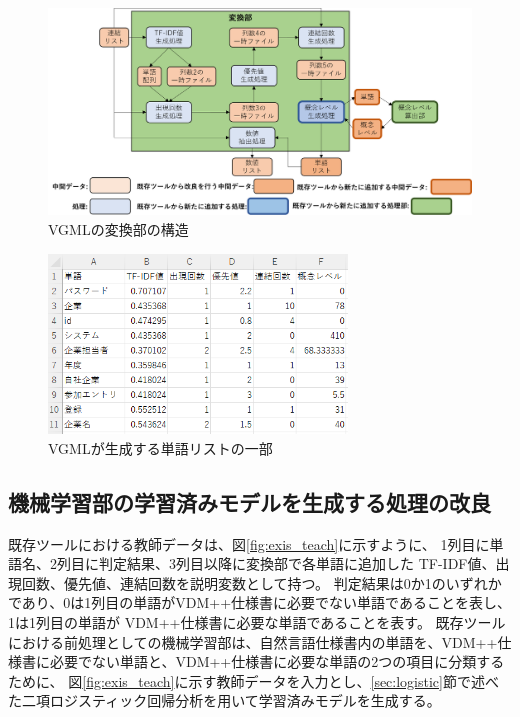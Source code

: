 \begin{figure}[t]
    \begin{center}
        \includegraphics[width=1.0\columnwidth]{image/vgml_transfer.png}
        \caption{VGMLの変換部の構造}
        \label{fig:vgml_transfer}
    \end{center}
\end{figure}

\begin{figure}[t]
    \begin{center}
        \includegraphics[width=300]{image/vgml_word_list.png}
        \caption{VGMLが生成する単語リストの一部}
        \label{fig:vgml_word_list}
    \end{center}
\end{figure}

\subsection{機械学習部の学習済みモデルを生成する処理の改良}
\label{sec:vgml_train_model}
既存ツールにおける教師データは、図\ref{fig:exis_teach}に示すように、
1列目に単語名、2列目に判定結果、3列目以降に変換部で各単語に追加した TF-IDF値、出現回数、優先値、連結回数を説明変数として持つ。
判定結果は0か1のいずれかであり、0は1列目の単語がVDM++仕様書に必要でない単語であることを表し、
1は1列目の単語が VDM++仕様書に必要な単語であることを表す。
既存ツールにおける前処理としての機械学習部は、自然言語仕様書内の単語を、VDM++仕様書に必要でない単語と、VDM++仕様書に必要な単語の2つの項目に分類するために、
図\ref{fig:exis_teach}に示す教師データを入力とし、\ref{sec:logistic}節で述べた二項ロジスティック回帰分析を用いて学習済みモデルを生成する。

